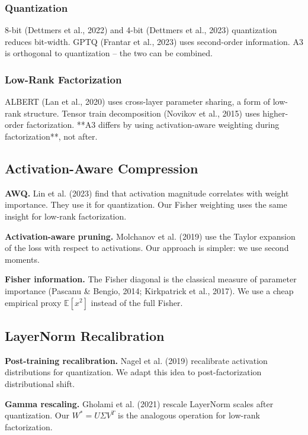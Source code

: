 \subsubsection{Quantization}

8-bit (Dettmers et al., 2022) and 4-bit (Dettmers et al., 2023) quantization 
reduces bit-width. GPTQ (Frantar et al., 2023) uses second-order 
information. A3 is orthogonal to quantization -- the two can be combined.

\subsubsection{Low-Rank Factorization}

ALBERT (Lan et al., 2020) uses cross-layer parameter sharing, a form of 
low-rank structure. Tensor train decomposition (Novikov et al., 2015) uses 
higher-order factorization. **A3 differs by using activation-aware weighting 
during factorization**, not after.

\subsection{Activation-Aware Compression}

\textbf{AWQ.} Lin et al. (2023) find that activation magnitude correlates with 
weight importance. They use it for quantization. Our Fisher weighting uses the 
same insight for low-rank factorization.

\textbf{Activation-aware pruning.} Molchanov et al. (2019) use the Taylor expansion 
of the loss with respect to activations. Our approach is simpler: we use 
second moments.

\textbf{Fisher information.} The Fisher diagonal is the classical measure of 
parameter importance (Pascanu \& Bengio, 2014; Kirkpatrick et al., 2017). We 
use a cheap empirical proxy $\mathbb{E}[x^2]$ instead of the full Fisher.

\subsection{LayerNorm Recalibration}

\textbf{Post-training recalibration.} Nagel et al. (2019) recalibrate activation 
distributions for quantization. We adapt this idea to post-factorization 
distributional shift.

\textbf{Gamma rescaling.} Gholami et al. (2021) rescale LayerNorm scales after 
quantization. Our $W^* = U \Sigma V^T$ is the analogous operation 
for low-rank factorization.

